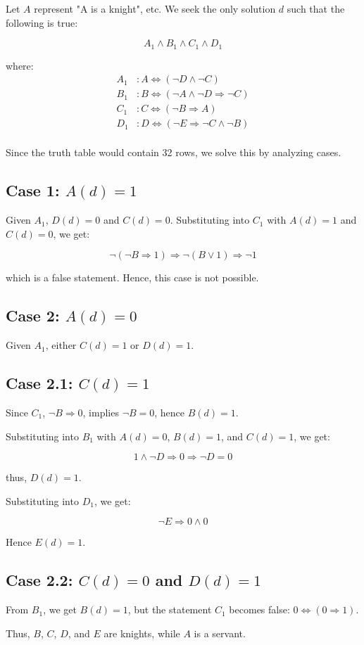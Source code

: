 \begin{answer}{1.12}
Let \( A \) represent "A is a knight", etc. We seek the only solution \( d \) such that the following is true:

\[
A_1 \land B_1 \land C_1 \land D_1
\]

where:
\begin{align*}
A_1 &: A \iff (\neg D \land \neg C)\\
B_1 &: B \iff (\neg A \land \neg D \Rightarrow \neg C)\\
C_1 &: C \iff (\neg B \Rightarrow A)\\
D_1 &: D \iff (\neg E \Rightarrow \neg C \land \neg B)\\
\end{align*}


Since the truth table would contain 32 rows, we solve this by analyzing cases.

\subsection*{Case 1: \( A(d) = 1 \)}

Given \( A_1 \), \( D(d) = 0 \) and \( C(d) = 0 \). Substituting into \( C_1 \) with \( A(d) = 1 \) and \( C(d) = 0 \), we get:

\[
\neg (\neg B \Rightarrow 1) \Rightarrow \neg(B \lor 1) \Rightarrow \neg 1
\]

which is a false statement. Hence, this case is not possible.

\subsection*{Case 2: \( A(d) = 0 \)}

Given \( A_1 \), either \( C(d) = 1 \) or \( D(d) = 1 \).

\subsection*{Case 2.1: \( C(d) = 1 \)}

Since \( C_1 \), \( \neg B \Rightarrow 0 \), implies \( \neg B = 0 \), hence \( B(d) = 1 \).

Substituting into \( B_1 \) with \( A(d) = 0 \), \( B(d) = 1 \), and \( C(d) = 1 \), we get:

\[
1 \land \neg D \Rightarrow 0 \Rightarrow \neg D = 0
\]

thus, \( D(d) = 1 \).

Substituting into \( D_1 \), we get:

\[
\neg E \Rightarrow 0 \land 0
\]

Hence \( E(d) = 1 \).

\subsection*{Case 2.2: \( C(d) = 0 \) and \( D(d) = 1 \)}

From \( B_1 \), we get \( B(d) = 1 \), but the statement \( C_1 \) becomes false: \( 0 \iff (0 \Rightarrow 1) \).

Thus, \( B \), \( C \), \( D \), and \( E \) are knights, while \( A \) is a servant.

\end{answer}
